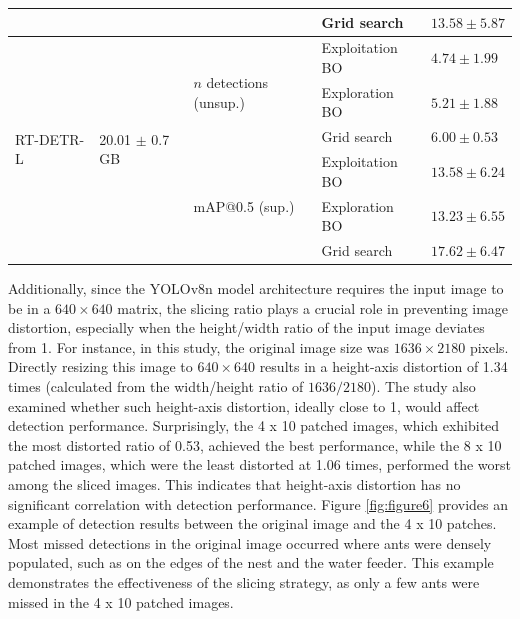 \begin{table}[htbp]
\begin{tabular}{lllll}
                            &                                       &                                            & Grid search & $13.58 \pm 5.87$ \\
    \midrule
    \multirow{6}{*}{RT-DETR-L} & \multirow{6}{*}{20.01 $\pm$ 0.7 GB} & \multirow{3}{*}{$n$ detections (unsup.)} & Exploitation BO & $4.74 \pm 1.99$ \\
                            &                                       &                                           & Exploration BO & $5.21 \pm 1.88$ \\
                            &                                       &                                           & Grid search & $6.00 \pm 0.53$ \\
    \cmidrule{3-5}
                            &                                       & \multirow{3}{*}{mAP@0.5 (sup.)}           & Exploitation BO & $13.58 \pm 6.24$ \\
                            &                                       &                                           & Exploration BO & $13.23 \pm 6.55$ \\
                            &                                       &                                           & Grid search & $17.62 \pm 6.47$ \\
    \bottomrule
    \end{tabular}

\end{table}




Additionally, since the YOLOv8n model architecture requires the input image to be in a $640 \times 640$ matrix, the slicing ratio plays a crucial role in preventing image distortion, especially when the height/width ratio of the input image deviates from 1. For instance, in this study, the original image size was $1636 \times 2180$ pixels. Directly resizing this image to $640 \times 640$ results in a height-axis distortion of 1.34 times (calculated from the width/height ratio of $1636/2180$). The study also examined whether such height-axis distortion, ideally close to 1, would affect detection performance. Surprisingly, the 4 x 10 patched images, which exhibited the most distorted ratio of 0.53, achieved the best performance, while the 8 x 10 patched images, which were the least distorted at 1.06 times, performed the worst among the sliced images. This indicates that height-axis distortion has no significant correlation with detection performance. Figure \ref{fig:figure6} provides an example of detection results between the original image and the 4 x 10 patches. Most missed detections in the original image occurred where ants were densely populated, such as on the edges of the nest and the water feeder. This example demonstrates the effectiveness of the slicing strategy, as only a few ants were missed in the 4 x 10 patched images.

